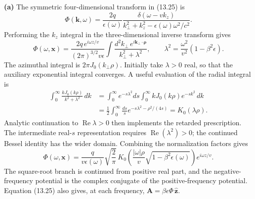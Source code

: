 \textbf{(a)} The symmetric four-dimensional transform in (13.25) is
\[
 \Phi(\mathbf k,\omega)
 =\frac{2q}{\epsilon(\omega)}
   \frac{\delta(\omega-vk_z)}
   {k_\perp^2+k_z^2-\epsilon(\omega)\omega^2/c^2}.
\]
Performing the $k_z$ integral in the three-dimensional inverse transform
gives
\[
 \Phi(\omega,\mathbf x)=
 \frac{2q\,e^{i\omega z/v}}{(2\pi)^{3/2}v\epsilon}
 \int\frac{d^2k_\perp\,e^{i\mathbf k_\perp\cdot\boldsymbol\rho}}
               {k_\perp^2+\lambda^2},
 \qquad
 \lambda^2=\frac{\omega^2}{v^2}(1-\beta^2\epsilon).
\]
The azimuthal integral is $2\pi J_0(k_\perp\rho)$. Initially take
$\lambda>0$ real, so that the auxiliary exponential integral converges.
A useful evaluation of the radial
integral is
\[
 \begin{split}
 \int_0^\infty\frac{kJ_0(k\rho)}{k^2+\lambda^2}\,dk
 &=\int_0^\infty e^{-s\lambda^2}ds
       \int_0^\infty kJ_0(k\rho)e^{-sk^2}\,dk\\
 &=\frac12\int_0^\infty\frac{ds}{s}
       e^{-s\lambda^2-\rho^2/(4s)}
 =K_0(\lambda\rho).
 \end{split}
\]
Analytic continuation to $\operatorname{Re}\lambda>0$ then implements
the retarded prescription. The intermediate real-$s$ representation
requires $\operatorname{Re}(\lambda^2)>0$; the continued Bessel
identity has the wider domain.
Combining the normalization factors gives
\[
 \boxed{\Phi(\omega,\mathbf x)
 =\frac{q}{v\epsilon(\omega)}\sqrt{\frac2\pi}\,
 K_0\!\left(\frac{|\omega|\rho}{v}
              \sqrt{1-\beta^2\epsilon(\omega)}\right)
 e^{i\omega z/v}.}
\]
The square-root branch is continued from positive real part, and the
negative-frequency potential is the complex conjugate of the
positive-frequency potential. Equation (13.25) also gives, at each
frequency, $\mathbf A=\beta\epsilon\Phi\,\hat{\mathbf z}$.

